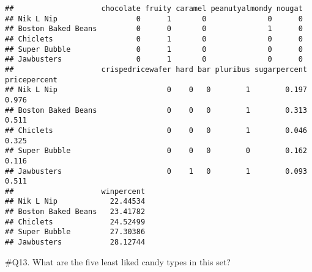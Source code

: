 \documentclass[
]{article}
\newenvironment{Shaded}{\begin{snugshade}}{\end{snugshade}}
\newcommand{\DataTypeTok}[1]{\textcolor[rgb]{0.13,0.29,0.53}{#1}}
\newcommand{\DecValTok}[1]{\textcolor[rgb]{0.00,0.00,0.81}{#1}}
\newcommand{\KeywordTok}[1]{\textcolor[rgb]{0.13,0.29,0.53}{\textbf{#1}}}
\newcommand{\NormalTok}[1]{#1}
\newcommand{\OperatorTok}[1]{\textcolor[rgb]{0.81,0.36,0.00}{\textbf{#1}}}
\newcommand{\StringTok}[1]{\textcolor[rgb]{0.31,0.60,0.02}{#1}}
\begin{document}
\begin{Shaded}
\end{Shaded}

\begin{verbatim}
##                    chocolate fruity caramel peanutyalmondy nougat
## Nik L Nip                  0      1       0              0      0
## Boston Baked Beans         0      0       0              1      0
## Chiclets                   0      1       0              0      0
## Super Bubble               0      1       0              0      0
## Jawbusters                 0      1       0              0      0
##                    crispedricewafer hard bar pluribus sugarpercent pricepercent
## Nik L Nip                         0    0   0        1        0.197        0.976
## Boston Baked Beans                0    0   0        1        0.313        0.511
## Chiclets                          0    0   0        1        0.046        0.325
## Super Bubble                      0    0   0        0        0.162        0.116
## Jawbusters                        0    1   0        1        0.093        0.511
##                    winpercent
## Nik L Nip            22.44534
## Boston Baked Beans   23.41782
## Chiclets             24.52499
## Super Bubble         27.30386
## Jawbusters           28.12744
\end{verbatim}

\#Q13. What are the five least liked candy types in this set?

\begin{Shaded}
\end{Shaded}
\end{document}

